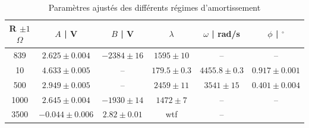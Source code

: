 \documentclass[preview]{standalone}
\begin{document}
\setcounter{table}{2}
\begin{table}[h!]
\centering
\label{tab:fits}
\renewcommand{\arraystretch}{1.2}
\begin{tabular}{|c|c|c|c|c|c|}
\hline
R $\pm 1$ $\Omega$ & $A$ | V & $B$ | V & $\lambda$ & $\omega$ | rad/s & $\phi$ | $^\circ$ \\
\hline
839 &
$2.625 \pm 0.004$ &
$-2384 \pm 16$ &
$1595 \pm 10$ &
-- & -- \\

10   & 
$4.633 \pm 0.005$ &
-- &
$179.5 \pm 0.3$ &
$4455.8 \pm 0.3$ &
$0.917 \pm 0.001$ \\

500   & 
$2.949 \pm 0.005$ &
-- &
$2459 \pm 11$ &
$3541 \pm 15$ &
$0.401 \pm 0.004$ \\

1000   &
$2.645 \pm 0.004$ &
$-1930 \pm 14$ &
$1472 \pm 7$ &
-- & -- \\

3500   &
$-0.044 \pm 0.006$ &
$2.82 \pm 0.01$ &
wtf &
-- \\
\hline
\end{tabular}
\caption{Paramètres ajustés des différents régimes d'amortissement}
\end{table}
\end{document}

